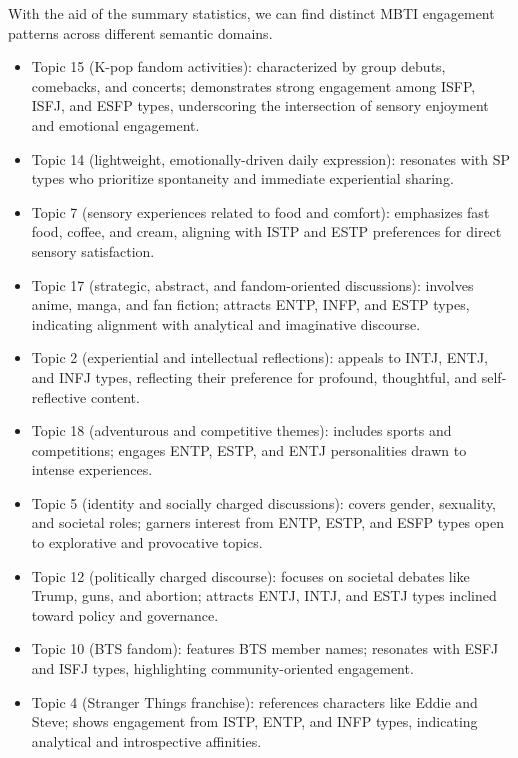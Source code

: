 \documentclass[12pt]{article}
\begin{document}
	 With the aid of the summary statistics, we can find distinct MBTI engagement patterns across different semantic domains. 
	\begin{itemize}
	\item Topic 15 (K-pop fandom activities): characterized by group debuts, comebacks, and concerts; demonstrates strong engagement among ISFP, ISFJ, and ESFP types, underscoring the intersection of sensory enjoyment and emotional engagement.
	\item Topic 14 (lightweight, emotionally-driven daily expression): resonates with SP types who prioritize spontaneity and immediate experiential sharing.
	\item Topic 7 (sensory experiences related to food and comfort): emphasizes fast food, coffee, and cream, aligning with ISTP and ESTP preferences for direct sensory satisfaction.
	\item Topic 17 (strategic, abstract, and fandom-oriented discussions): involves anime, manga, and fan fiction; attracts ENTP, INFP, and ESTP types, indicating alignment with analytical and imaginative discourse.
	\item Topic 2 (experiential and intellectual reflections): appeals to INTJ, ENTJ, and INFJ types, reflecting their preference for profound, thoughtful, and self-reflective content.
	\item Topic 18 (adventurous and competitive themes): includes sports and competitions; engages ENTP, ESTP, and ENTJ personalities drawn to intense experiences.
	\item Topic 5 (identity and socially charged discussions): covers gender, sexuality, and societal roles; garners interest from ENTP, ESTP, and ESFP types open to explorative and provocative topics.
	\item Topic 12 (politically charged discourse): focuses on societal debates like Trump, guns, and abortion; attracts ENTJ, INTJ, and ESTJ types inclined toward policy and governance.
	\item Topic 10 (BTS fandom): features BTS member names; resonates with ESFJ and ISFJ types, highlighting community-oriented engagement.
	\item Topic 4 (Stranger Things franchise): references characters like Eddie and Steve; shows engagement from ISTP, ENTP, and INFP types, indicating analytical and introspective affinities.
	\end{itemize}
	
\end{document}
